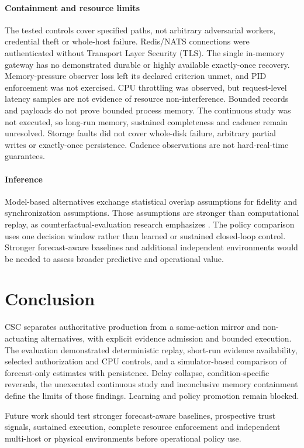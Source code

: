 \documentclass[conference,letterpaper]{IEEEtran}
\begin{document}
\paragraph{Containment and resource limits}
The tested controls cover specified paths, not arbitrary adversarial workers,
credential theft or whole-host failure. Redis/NATS connections were authenticated
without Transport Layer Security (TLS). The single in-memory gateway has no
demonstrated durable or highly available exactly-once recovery. Memory-pressure
observer loss left its declared criterion unmet, and PID enforcement was not
exercised. CPU throttling was observed, but request-level latency samples are
not evidence of resource non-interference. Bounded records and payloads do not
prove bounded process memory. The continuous study was not executed, so
long-run memory, sustained completeness and cadence remain unresolved.
Storage faults did not cover whole-disk failure, arbitrary partial writes or
exactly-once persistence. Cadence observations are not hard-real-time guarantees.

\paragraph{Inference}
Model-based alternatives exchange statistical overlap assumptions for fidelity
and synchronization assumptions. Those assumptions are stronger than
computational replay, as counterfactual-evaluation research emphasizes
\cite{jiang2016doubly,wang2017optimal}. The policy comparison uses one decision
window rather than learned or sustained closed-loop control. Stronger
forecast-aware baselines and additional independent environments would be
needed to assess broader predictive and operational value.

\section{Conclusion}
CSC separates authoritative production from a same-action mirror and
non-actuating alternatives, with explicit evidence admission and bounded
execution. The evaluation demonstrated deterministic replay, short-run evidence
availability, selected authorization and CPU controls, and a simulator-based
comparison of forecast-only estimates with persistence. Delay collapse,
condition-specific reversals, the unexecuted continuous study and inconclusive
memory containment define the limits of those findings. Learning and policy
promotion remain blocked.

Future work should test stronger forecast-aware baselines, prospective trust
signals, sustained execution, complete resource enforcement and independent
multi-host or physical environments before operational policy use.
\end{document}
